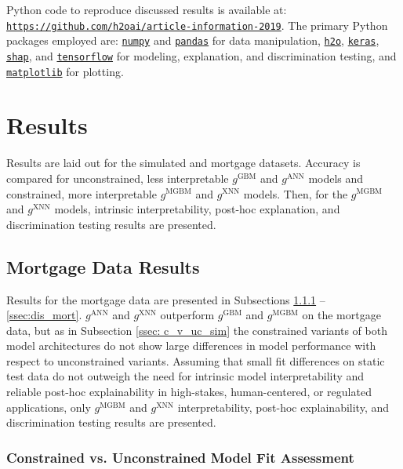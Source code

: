 \documentclass[information,article,submit,moreauthors,pdftex]{definitions/mdpi}
\begin{document}
Python code to reproduce discussed results is available at: \texttt{\url{https://github.com/h2oai/article-information-2019}}. The primary Python packages employed are: \href{https://numpy.org/}{\texttt{numpy}} and \href{https://pandas.pydata.org/}{\texttt{pandas}} for data manipulation, \href{https://github.com/h2oai/h2o-3}{\texttt{h2o}}, \href{https://keras.io/}{\texttt{keras}}, \href{https://github.com/slundberg/shap}{\texttt{shap}}, and \href{https://www.tensorflow.org/}{\texttt{tensorflow}} for modeling, explanation, and discrimination testing, and \href{https://matplotlib.org/}{\texttt{matplotlib}} for plotting. 

\section{Results}\label{sec:res}

Results are laid out for the simulated and mortgage datasets. Accuracy is compared for unconstrained, less interpretable $g^{\text{GBM}}$ and $g^{\text{ANN}}$ models and constrained, more interpretable $g^{\text{MGBM}}$ and $g^{\text{XNN}}$ models. Then, for the  $g^{\text{MGBM}}$ and $g^{\text{XNN}}$ models, intrinsic interpretability, post-hoc explanation, and discrimination testing results are presented.

\subsection{Mortgage Data Results}

Results for the mortgage data are presented in Subsections \ref{ssec:c_v_uc_mort} -- \ref{ssec:dis_mort}.  $g^\text{ANN}$ and $g^\text{XNN}$ outperform $g^\text{GBM}$ and $g^\text{MGBM}$ on the mortgage data, but as in Subsection \ref{ssec: c_v_uc_sim} the constrained variants of both model architectures do not show large differences in model performance with respect to unconstrained variants. Assuming that small fit differences on static test data do not outweigh the need for intrinsic model interpretability and reliable post-hoc explainability in high-stakes, human-centered, or regulated applications, only $g^\text{MGBM}$ and $g^\text{XNN}$ interpretability, post-hoc explainability, and discrimination testing results are presented. 

\subsubsection{Constrained vs. Unconstrained Model Fit Assessment}\label{ssec:c_v_uc_mort}
\end{document}
